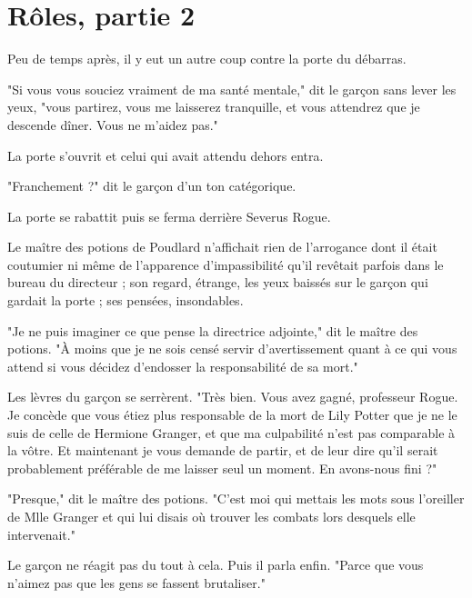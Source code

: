 
\chapter{Rôles, partie 2}

Peu de temps après, il y eut un autre coup contre la porte du débarras.

"Si vous vous souciez vraiment de ma santé mentale," dit le garçon sans lever les yeux, "vous partirez, vous me laisserez tranquille, et vous attendrez que je descende dîner. Vous ne m'aidez pas."

La porte s'ouvrit et celui qui avait attendu dehors entra.

"Franchement ?" dit le garçon d'un ton catégorique.

La porte se rabattit puis se ferma derrière Severus Rogue.

Le maître des potions de Poudlard n'affichait rien de l'arrogance dont il était coutumier ni même de l'apparence d'impassibilité qu'il revêtait parfois dans le bureau du directeur ; son regard, étrange, les yeux baissés sur le garçon qui gardait la porte ; ses pensées, insondables.

"Je ne puis imaginer ce que pense la directrice adjointe," dit le maître des potions. "À moins que je ne sois censé servir d'avertissement quant à ce qui vous attend si vous décidez d'endosser la responsabilité de sa mort."

Les lèvres du garçon se serrèrent. "Très bien. Vous avez gagné, professeur Rogue. Je concède que vous étiez plus responsable de la mort de Lily Potter que je ne le suis de celle de Hermione Granger, et que ma culpabilité n'est pas comparable à la vôtre. Et maintenant je vous demande de partir, et de leur dire qu'il serait probablement préférable de me laisser seul un moment. En avons-nous fini ?"

"Presque," dit le maître des potions. "C'est moi qui mettais les mots sous l'oreiller de Mlle Granger et qui lui disais où trouver les combats lors desquels elle intervenait."

Le garçon ne réagit pas du tout à cela. Puis il parla enfin. "Parce que vous n'aimez pas que les gens se fassent brutaliser."


